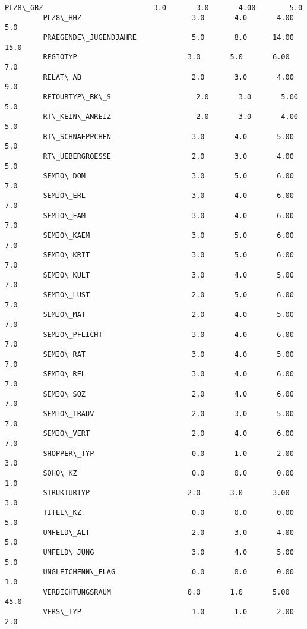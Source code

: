 \documentclass[11pt]{article}
\begin{document}
\begin{Verbatim}[commandchars=\\\{\}]
         PLZ8\_GBZ                          3.0       3.0       4.00        5.0  
         PLZ8\_HHZ                          3.0       4.0       4.00        5.0  
         PRAEGENDE\_JUGENDJAHRE             5.0       8.0      14.00       15.0  
         REGIOTYP                          3.0       5.0       6.00        7.0  
         RELAT\_AB                          2.0       3.0       4.00        9.0  
         RETOURTYP\_BK\_S                    2.0       3.0       5.00        5.0  
         RT\_KEIN\_ANREIZ                    2.0       3.0       4.00        5.0  
         RT\_SCHNAEPPCHEN                   3.0       4.0       5.00        5.0  
         RT\_UEBERGROESSE                   2.0       3.0       4.00        5.0  
         SEMIO\_DOM                         3.0       5.0       6.00        7.0  
         SEMIO\_ERL                         3.0       4.0       6.00        7.0  
         SEMIO\_FAM                         3.0       4.0       6.00        7.0  
         SEMIO\_KAEM                        3.0       5.0       6.00        7.0  
         SEMIO\_KRIT                        3.0       5.0       6.00        7.0  
         SEMIO\_KULT                        3.0       4.0       5.00        7.0  
         SEMIO\_LUST                        2.0       5.0       6.00        7.0  
         SEMIO\_MAT                         2.0       4.0       5.00        7.0  
         SEMIO\_PFLICHT                     3.0       4.0       6.00        7.0  
         SEMIO\_RAT                         3.0       4.0       5.00        7.0  
         SEMIO\_REL                         3.0       4.0       6.00        7.0  
         SEMIO\_SOZ                         2.0       4.0       6.00        7.0  
         SEMIO\_TRADV                       2.0       3.0       5.00        7.0  
         SEMIO\_VERT                        2.0       4.0       6.00        7.0  
         SHOPPER\_TYP                       0.0       1.0       2.00        3.0  
         SOHO\_KZ                           0.0       0.0       0.00        1.0  
         STRUKTURTYP                       2.0       3.0       3.00        3.0  
         TITEL\_KZ                          0.0       0.0       0.00        5.0  
         UMFELD\_ALT                        2.0       3.0       4.00        5.0  
         UMFELD\_JUNG                       3.0       4.0       5.00        5.0  
         UNGLEICHENN\_FLAG                  0.0       0.0       0.00        1.0  
         VERDICHTUNGSRAUM                  0.0       1.0       5.00       45.0  
         VERS\_TYP                          1.0       1.0       2.00        2.0  

\end{Verbatim}
\end{document}
